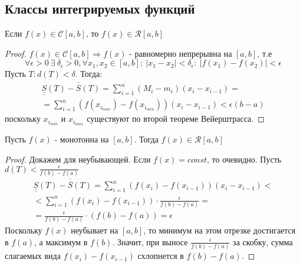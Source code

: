 \subsection{Классы интегрируемых функций}
\begin{theorem}
    Если $f(x)\in \mathcal{C}[a,b]$, то $f(x)\in \mathcal{R}[a,b]$
\end{theorem} 
\begin{proof}
    $f(x)\in \mathcal{C}[a,b] \Rightarrow f(x)$ - равномерно непрерывна на $[a,b]$, т.е
    \[\forall \epsilon>0\ \exists\ \delta_{\epsilon}>0, \forall x_1, x_2\in [a,b]:\ |x_1-x_2|<\delta_{\epsilon}:\ |f(x_1)-f(x_2)|<\epsilon\]
    Пусть $T: d(T)<\delta$. Тогда:
    \begin{align*}
    \underline{\underline{S}}(T)-\overline{\overline{S}}(T)=\sum\limits_{i=1}^{n}(M_i-m_i)(x_i-x_{i-1})=\\=\sum\limits_{i=1}^{n}(f(x_{i_{max}})-f(x_{i_{min}}))(x_i-x_{i-1})<\epsilon(b-a)
    \end{align*}
    поскольку $x_{i_{min}}$ и $x_{i_{max}}$ существуют по второй теореме Вейерштрасса.
\end{proof} 
\begin{theorem}
    Пусть $f(x)$ - монотонна на $[a,b]$. Тогда $f(x)\in \mathcal{R}[a,b]$
\end{theorem} 
\begin{proof}
    Докажем для неубывающей. Если $f(x)=const$, то очевидно.
    Пусть $d(T)<\frac{\epsilon}{f(b)-f(a)}$
    \begin{multline*}
        \underline{\underline{S}}(T)-\overline{\overline{S}}(T)=\sum\limits_{i=1}^{n}(f(x_i)-f(x_{i-1}))(x_i-x_{i-1})<\\
        <\sum\limits_{i=1}^{n}(f(x_i)-f(x_{i-1}))\cdot \frac{\epsilon}{f(b)-f(a)}=\\
        =\frac{\epsilon}{f(b)-f(a)}\cdot (f(b)-f(a))=\epsilon
    \end{multline*}
    Поскольку $f(x)$ неубывает на $[a,b]$, то минимум на этом отрезке достигается в $f(a)$, а максимум в $f(b)$. Значит, при выносе $\frac{\epsilon}{f(b)-f(a)}$ за скобку, сумма слагаемых вида $f(x_i)-f(x_{i-1})$ схлопнется в $f(b)-f(a)$.
\end{proof} 
